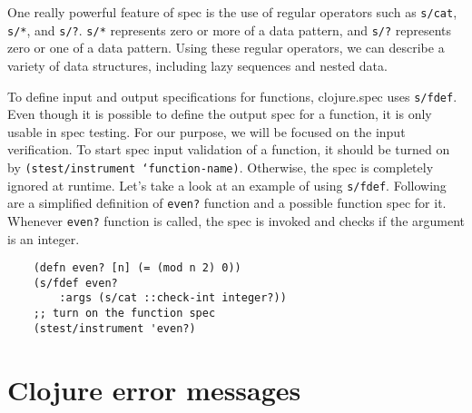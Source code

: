 \documentclass[12pt]{article}
\begin{document}
	One really powerful feature of spec is the use of regular operators such as \texttt{s/cat}, \texttt{s/*}, and \texttt{s/?}.
	\texttt{s/*} represents zero or more of a data pattern, and \texttt{s/?} represents zero or one of a data pattern.
	Using these regular operators, we can describe a variety of data structures, including lazy sequences and nested data. 

	To define input and output specifications for functions, clojure.spec uses \texttt{s/fdef}. Even though it is possible to 
	define the output spec for a function, it is only usable in spec testing. For our purpose, we will be focused on the input 
	verification. To start spec input validation of a function, it should be turned on by \texttt{(stest/instrument `function-name)}. 
	Otherwise, the spec is completely ignored at runtime. Let's take a look at an example of using \texttt{s/fdef}. Following 
	are a simplified definition of \texttt{even?} function and a possible function spec for it. Whenever \texttt{even?} function
	is called, the spec is invoked and checks if the argument is an integer.
	
	\begin{verbatim}
	(defn even? [n] (= (mod n 2) 0))
	(s/fdef even?
    	:args (s/cat ::check-int integer?))
	;; turn on the function spec
	(stest/instrument 'even?)
	\end{verbatim}
	
	


\section{Clojure error messages}
\end{document}
